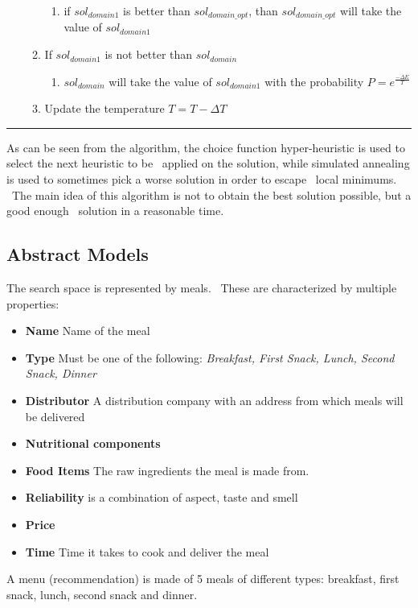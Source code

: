 \begin{enumerate}[itemsep=1pt, parsep=1pt, topsep=1pt]
\begin{enumerate}[itemsep=1pt, parsep=1pt, topsep=1pt]
\begin{enumerate}[itemsep=1pt, parsep=1pt, topsep=1pt]
                  \item if $sol_{domain1}$ is better than $sol_{domain\_opt}$, than $sol_{domain\_opt}$ will take the value of $sol_{domain1}$
              \end{enumerate}
              \item If $sol_{domain1}$ is not better than $sol_{domain}$
              \begin{enumerate}[itemsep=1pt, parsep=1pt, topsep=1pt]
                  \item $sol_{domain}$ will take the value of $sol_{domain1}$ with the probability $P = e^{\frac{-\Delta E}{T}}$
              \end{enumerate}
              \item Update the temperature $T = T - \Delta T$
    \end{enumerate}
\end{enumerate}
\noindent\rule{\textwidth}{1pt}

As can be seen from the algorithm, the choice function hyper-heuristic is used to select the next heuristic to be \
applied on the solution, while simulated annealing is used to sometimes pick a worse solution in order to escape \
local minimums. \
The main idea of this algorithm is not to obtain the best solution possible, but a good enough \
solution in a reasonable time.


\subsection{Abstract Models}
\label{subsec:analysis-models}
The search space is represented by meals. \
These are characterized by multiple properties:
\begin{itemize}
    \item \textbf{Name} Name of the meal
    \item \textbf{Type} Must be one of the following: \textit{Breakfast, First Snack, Lunch, Second Snack, Dinner}
    \item \textbf{Distributor} A distribution company with an address from which meals will be delivered
    \item \textbf{Nutritional components}
    \item \textbf{Food Items} The raw ingredients the meal is made from.
    \item \textbf{Reliability} is a combination of aspect, taste and smell
    \item \textbf{Price}
    \item \textbf{Time} Time it takes to cook and deliver the meal
\end{itemize}
A menu (recommendation) is made of 5 meals of different types: breakfast, first snack, lunch, second snack and dinner.




